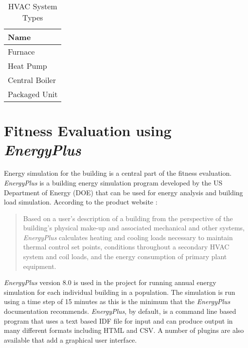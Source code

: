 
\begin{table}[htbp]
    \centering
    \begin{tabular}{|l|}
    \hline
    Name                \\ \hline
    Furnace             \\
    Heat Pump            \\
    Central Boiler        \\
    Packaged Unit          \\ \hline
    \end{tabular}
    \caption{HVAC System Types}
    \label{table:havc_type}
\end{table}



\section{Fitness Evaluation using {\it EnergyPlus}}

Energy simulation for the building is a central part of the fitness evaluation. \textit{EnergyPlus} is a building energy simulation program developed by the US Department of Energy (DOE) that can be used for energy analysis and building load simulation. According to the product website \cite{eplus}:
\begin{quote}
Based on a user's description of a building from the perspective of the building's physical make-up and associated mechanical and other systems, \textit{EnergyPlus} calculates heating and cooling loads necessary to maintain thermal control set points, conditions throughout a secondary HVAC system and coil loads, and the energy consumption of primary plant equipment. 
\end{quote}
\textit{EnergyPlus} version 8.0 is used in the project for running annual energy simulation for each individual building in a population. The simulation is run using a time step of 15 minutes as this is the minimum that the \textit{EnergyPlus} documentation recommends. \textit{EnergyPlus}, by default, is a command line based program that uses a text based IDF file for input and can produce output in many different formats including HTML and CSV. A number of plugins are also available that add a graphical user interface.

